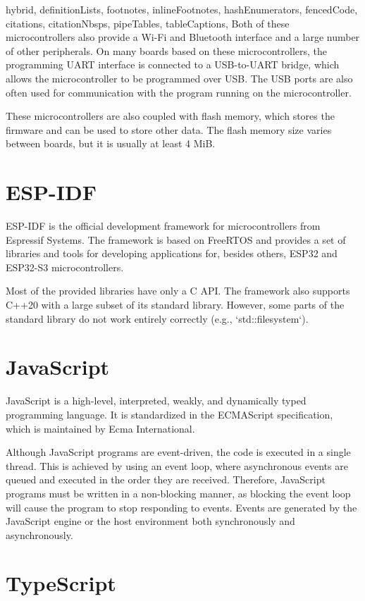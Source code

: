 \begin{markdown*}{%
  hybrid,
  definitionLists,
  footnotes,
  inlineFootnotes,
  hashEnumerators,
  fencedCode,
  citations,
  citationNbsps,
  pipeTables,
  tableCaptions,
}
Both of these microcontrollers also provide a Wi-Fi and Bluetooth interface and a large number of other peripherals. On many boards based on these microcontrollers, the programming UART interface is connected to a USB-to-UART bridge, which allows the microcontroller to be programmed over USB. The USB ports are also often used for communication with the program running on the microcontroller.

These microcontrollers are also coupled with flash memory, which stores the firmware and can be used to store other data. The flash memory size varies between boards, but it is usually at least 4 MiB.

\section{ESP-IDF}

ESP-IDF is the official development framework for microcontrollers from Espressif Systems. The framework is based on FreeRTOS and provides a set of libraries and tools for developing applications for, besides others, ESP32 and ESP32-S3 microcontrollers.

Most of the provided libraries have only a C API. The framework also supports C++20 with a large subset of its standard library. However, some parts of the standard library do not work entirely correctly (e.g., `std::filesystem`).

\section{JavaScript}

JavaScript is a high-level, interpreted, weakly, and dynamically typed programming language. It is standardized in the ECMAScript specification, which is maintained by Ecma International.

Although JavaScript programs are event-driven, the code is executed in a single thread. This is achieved by using an event loop, where asynchronous events are queued and executed in the order they are received. Therefore, JavaScript programs must be written in a non-blocking manner, as blocking the event loop will cause the program to stop responding to events. Events are generated by the JavaScript engine or the host environment both synchronously and asynchronously.

\section{TypeScript}


\end{markdown*}
